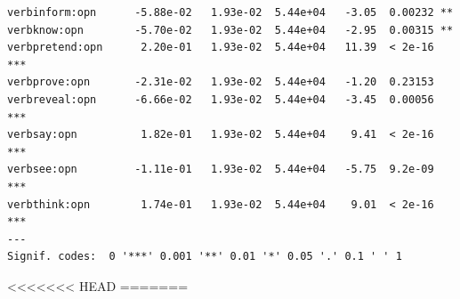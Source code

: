 \documentclass[10pt]{article}\usepackage[]{graphicx}\usepackage[dvipsnames]{xcolor}
\makeatletter
\newenvironment{kframe}{%
 \def\at@end@of@kframe{}%
 \ifinner\ifhmode%
  \def\at@end@of@kframe{\end{minipage}}%
  \begin{minipage}{\columnwidth}%
 \fi\fi%
 \def\FrameCommand##1{\hskip\@totalleftmargin \hskip-\fboxsep
 \colorbox{shadecolor}{##1}\hskip-\fboxsep
     \hskip-\linewidth \hskip-\@totalleftmargin \hskip\columnwidth}%
 \MakeFramed {\advance\hsize-\width
   \@totalleftmargin\z@ \linewidth\hsize
   \@setminipage}}%
 {\par\unskip\endMakeFramed%
 \at@end@of@kframe}
\newenvironment{knitrout}{}{} %
\makeatother
\begin{document}
\begin{knitrout}
\begin{kframe}
\begin{verbatim}
verbinform:opn      -5.88e-02   1.93e-02  5.44e+04   -3.05  0.00232 ** 
verbknow:opn        -5.70e-02   1.93e-02  5.44e+04   -2.95  0.00315 ** 
verbpretend:opn      2.20e-01   1.93e-02  5.44e+04   11.39  < 2e-16 ***
verbprove:opn       -2.31e-02   1.93e-02  5.44e+04   -1.20  0.23153    
verbreveal:opn      -6.66e-02   1.93e-02  5.44e+04   -3.45  0.00056 ***
verbsay:opn          1.82e-01   1.93e-02  5.44e+04    9.41  < 2e-16 ***
verbsee:opn         -1.11e-01   1.93e-02  5.44e+04   -5.75  9.2e-09 ***
verbthink:opn        1.74e-01   1.93e-02  5.44e+04    9.01  < 2e-16 ***
---
Signif. codes:  0 '***' 0.001 '**' 0.01 '*' 0.05 '.' 0.1 ' ' 1
\end{verbatim}
\end{kframe}
\end{knitrout}
<<<<<<< HEAD
% 
% 
% 
% 
=======
\end{document}
